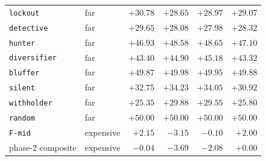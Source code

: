 \begin{longtable}{@{}l l r r r r@{}}
\texttt{lockout} & far & $+30.78$ & $+28.65$ & $+28.97$ & $+29.07$ \\
\texttt{detective} & far & $+29.65$ & $+28.08$ & $+27.98$ & $+28.32$ \\
\texttt{hunter} & far & $+46.93$ & $+48.58$ & $+48.65$ & $+47.10$ \\
\texttt{diversifier} & far & $+43.40$ & $+44.90$ & $+45.18$ & $+43.32$ \\
\texttt{bluffer} & far & $+49.87$ & $+49.98$ & $+49.95$ & $+49.88$ \\
\texttt{silent} & far & $+32.75$ & $+34.23$ & $+34.05$ & $+30.92$ \\
\texttt{withholder} & far & $+25.35$ & $+29.88$ & $+29.55$ & $+25.80$ \\
\texttt{random} & far & $+50.00$ & $+50.00$ & $+50.00$ & $+50.00$ \\
\texttt{F-mid} & expensive & $+2.15$ & $-3.15$ & $-0.10$ & $+2.00$ \\
phase-2 composite & expensive & $-0.04$ & $-3.69$ & $-2.08$ & $+0.00$ \\
\bottomrule
\end{longtable}
